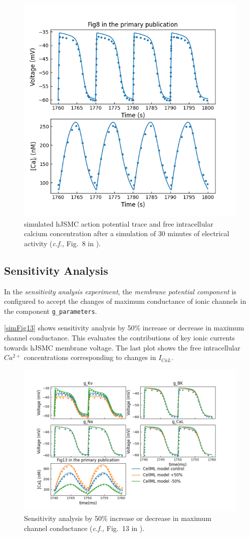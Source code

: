 \documentclass[fleqn,10pt]{physiome}
\begin{document}
\begin{figure}[ht]\centering
\includegraphics[width=0.7\linewidth]{./figs/simFig8.png}
\caption{simulated hJSMC action potential trace and free intracellular calcium concentration after a simulation of 30 minutes of electrical activity  (\emph{c.f.,} Fig.~8 in \citet{poh2012quantitative}).}
\label{simFig8}
\end{figure}


\subsection{Sensitivity Analysis}
In the \emph{sensitivity analysis experiment}, the \emph{membrane potential component} is configured to accept the changes of maximum conductance of ionic channels in the component \texttt{g\_parameters}.

\autoref{simFig13} shows sensitivity analysis by 50\% increase or decrease in maximum channel conductance. This evaluates the contributions of key ionic currents towards hJSMC membrane voltage. The last plot shows the free intracellular $Ca^{2+}$ concentrations corresponding to changes in $I_{CaL}$.

\begin{figure}[ht]\centering
\includegraphics[width=0.9\linewidth]{./figs/simFig13.png}
\caption{Sensitivity analysis by 50\% increase or decrease in maximum channel conductance  (\emph{c.f.,} Fig.~13 in \citet{poh2012quantitative}).}
\label{simFig13}
\end{figure}
\end{document}
